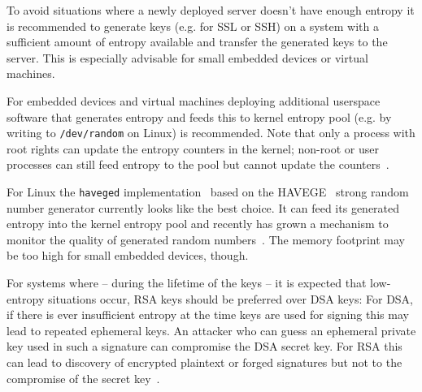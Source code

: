 To avoid situations where a newly deployed server doesn't have enough
entropy it is recommended to generate keys (e.g. for SSL or SSH) on
a system with a sufficient amount of entropy available and transfer the generated keys
to the server.  This is especially advisable for small embedded devices
or virtual machines.

For embedded devices and virtual machines deploying additional userspace
software that generates entropy and feeds this to kernel entropy pool
(e.g. by writing to \verb+/dev/random+ on Linux) is recommended. Note
that only a process with root rights can update the entropy counters in the
kernel; non-root or user processes can still feed entropy to the pool but
cannot update the counters~\cite{Wikipedia:/dev/random}.

For Linux the \verb+haveged+
implementation~\cite{HAV13a} based on the HAVEGE~\cite{SS03}
strong random number generator currently looks like the best choice. It
can feed its generated entropy into the kernel entropy pool and recently
has grown a mechanism to monitor the quality of generated random
numbers~\cite{HAV13b}. The memory footprint may be too high for small
embedded devices, though.

For systems where -- during the lifetime of the keys -- it is expected
that low-entropy situations occur, RSA keys should be preferred over DSA
keys: For DSA, if there is ever insufficient entropy at the time keys
are used for signing this may lead to repeated ephemeral keys. An
attacker who can guess an ephemeral private key used in such a signature
can compromise the DSA secret key.
For RSA this can lead to discovery of encrypted plaintext or forged
signatures but not to the compromise of the secret key~\cite{HDWH12}.
